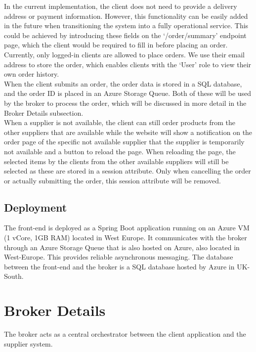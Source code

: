 \documentclass[10pt,a4paper,kul]{kulakarticle} %
\begin{document}
	\noindent In the current implementation, the client does not need to provide a delivery address or payment information. However, this functionality can be easily added in the future when transitioning the system into a fully operational service. This could be achieved by introducing these fields on the `/order/summary' endpoint page, which the client would be required to fill in before placing an order. Currently, only logged-in clients are allowed to place orders. We use their email address to store the order, which enables clients with the `User' role to view their own order history.\\
	\newline
	When the client submits an order, the order data is stored in a SQL database, and the order ID is placed in an Azure Storage Queue. Both of these will be used by the broker to process the order, which will be discussed in more detail in the Broker Details subsection.\\
	\newline
	When a supplier is not available, the client can still order products from the other suppliers that are available while the website will show a notification on the order page of the specific not available supplier that the supplier is temporarily not available and a button to reload the page. When reloading the page, the selected items by the clients from the other available suppliers will still be selected as these are stored in a session attribute. Only when cancelling the order or actually submitting the order, this session attribute will be removed.
	
	\subsection{Deployment}
	The front-end is deployed as a Spring Boot application running on an Azure VM (1 vCore, 1GB RAM) located in West Europe. It communicates with the broker through an Azure Storage Queue that is also hosted on Azure, also located in West-Europe. This provides reliable asynchronous messaging. The database between the front-end and the broker is a SQL database hosted by Azure in UK-South.
	
	\section{Broker Details}
		The broker acts as a central orchestrator between the client application and the supplier system. 
\end{document}
